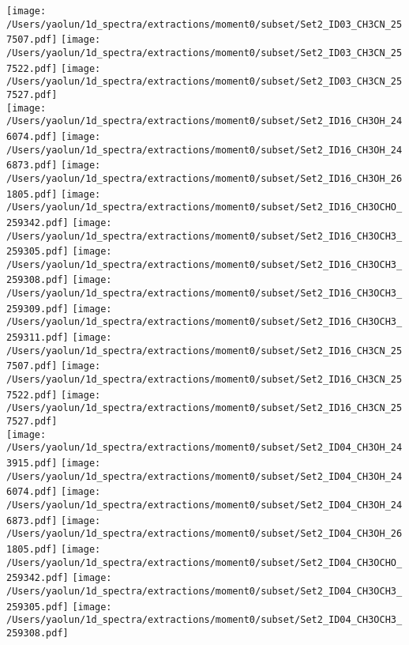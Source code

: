 \begin{figure*}[htbp!]
  \texttt{[image: /Users/yaolun/1d\_spectra/extractions/moment0/subset/Set2\_ID03\_CH3CN\_257507.pdf]}
  \texttt{[image: /Users/yaolun/1d\_spectra/extractions/moment0/subset/Set2\_ID03\_CH3CN\_257522.pdf]}
  \texttt{[image: /Users/yaolun/1d\_spectra/extractions/moment0/subset/Set2\_ID03\_CH3CN\_257527.pdf]}
  \\
  \texttt{[image: /Users/yaolun/1d\_spectra/extractions/moment0/subset/Set2\_ID16\_CH3OH\_246074.pdf]}
  \texttt{[image: /Users/yaolun/1d\_spectra/extractions/moment0/subset/Set2\_ID16\_CH3OH\_246873.pdf]}
  \texttt{[image: /Users/yaolun/1d\_spectra/extractions/moment0/subset/Set2\_ID16\_CH3OH\_261805.pdf]}
  \texttt{[image: /Users/yaolun/1d\_spectra/extractions/moment0/subset/Set2\_ID16\_CH3OCHO\_259342.pdf]}
  \texttt{[image: /Users/yaolun/1d\_spectra/extractions/moment0/subset/Set2\_ID16\_CH3OCH3\_259305.pdf]}
  \texttt{[image: /Users/yaolun/1d\_spectra/extractions/moment0/subset/Set2\_ID16\_CH3OCH3\_259308.pdf]}
  \texttt{[image: /Users/yaolun/1d\_spectra/extractions/moment0/subset/Set2\_ID16\_CH3OCH3\_259309.pdf]}
  \texttt{[image: /Users/yaolun/1d\_spectra/extractions/moment0/subset/Set2\_ID16\_CH3OCH3\_259311.pdf]}
  \texttt{[image: /Users/yaolun/1d\_spectra/extractions/moment0/subset/Set2\_ID16\_CH3CN\_257507.pdf]}
  \texttt{[image: /Users/yaolun/1d\_spectra/extractions/moment0/subset/Set2\_ID16\_CH3CN\_257522.pdf]}
  \texttt{[image: /Users/yaolun/1d\_spectra/extractions/moment0/subset/Set2\_ID16\_CH3CN\_257527.pdf]}
  \\
  \texttt{[image: /Users/yaolun/1d\_spectra/extractions/moment0/subset/Set2\_ID04\_CH3OH\_243915.pdf]}
  \texttt{[image: /Users/yaolun/1d\_spectra/extractions/moment0/subset/Set2\_ID04\_CH3OH\_246074.pdf]}
  \texttt{[image: /Users/yaolun/1d\_spectra/extractions/moment0/subset/Set2\_ID04\_CH3OH\_246873.pdf]}
  \texttt{[image: /Users/yaolun/1d\_spectra/extractions/moment0/subset/Set2\_ID04\_CH3OH\_261805.pdf]}
  \texttt{[image: /Users/yaolun/1d\_spectra/extractions/moment0/subset/Set2\_ID04\_CH3OCHO\_259342.pdf]}
  \texttt{[image: /Users/yaolun/1d\_spectra/extractions/moment0/subset/Set2\_ID04\_CH3OCH3\_259305.pdf]}
  \texttt{[image: /Users/yaolun/1d\_spectra/extractions/moment0/subset/Set2\_ID04\_CH3OCH3\_259308.pdf]}

\end{figure*}

